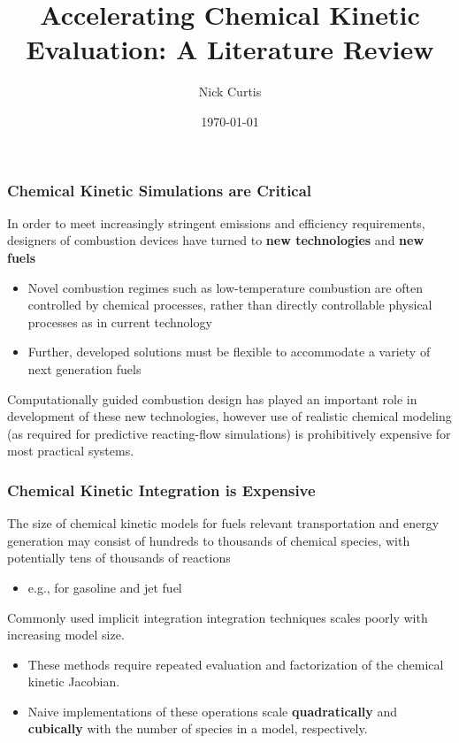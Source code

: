 \documentclass{beamer}
\title{Accelerating Chemical Kinetic Evaluation: A Literature Review}
\author{Nick Curtis}
\institute{University of Connecticut}
\date{\today}
\begin{document}
\maketitle

\begin{frame}
\frametitle{Chemical Kinetic Simulations are \textbf{Critical}}
In order to meet increasingly stringent emissions and efficiency requirements, designers of combustion devices have turned to \textbf{new technologies} and \textbf{new fuels}
\begin{itemize}
 \item Novel combustion regimes such as low-temperature combustion are often controlled by chemical processes, rather than directly controllable physical processes as in current technology
 \item Further, developed solutions must be flexible to accommodate a variety of next generation fuels
\end{itemize}
Computationally guided combustion design has played an important role in development of these new technologies, however use of realistic chemical modeling (as required for predictive reacting-flow simulations) is prohibitively expensive for most practical systems. 
\end{frame}

\begin{frame}
 \frametitle{Chemical Kinetic Integration is \textbf{Expensive}}
 The size of chemical kinetic models for fuels relevant transportation and energy generation may consist of hundreds to thousands of chemical species, with potentially tens of thousands of reactions
 \begin{itemize}
  \item e.g., for gasoline  and jet fuel
 \end{itemize}
 Commonly used implicit integration integration techniques scales poorly with increasing model size.
 \begin{itemize}
  \item These methods require repeated evaluation and factorization of the chemical kinetic Jacobian.
  \item Naive implementations of these operations scale \textbf{quadratically} and \textbf{cubically} with the number of species in a model, respectively.
 \end{itemize}
\end{frame}
\end{document}
